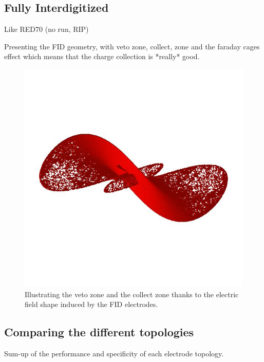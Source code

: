 \subsection{Fully Interdigitized}

Like RED70 (no run, RIP)

Presenting the FID geometry, with veto zone, collect, zone and the faraday cages effect which means that the charge collection is *really* good.

\begin{figure}
\centering
\includegraphics[width=\linewidth]{Figures/placeholder.jpg}
\caption{Illustrating the veto zone and the collect zone thanks to the electric field shape induced by the FID electrodes.}
\label{fig:fid-illustration}
\end{figure}

\subsection{Comparing the different topologies}

\begin{table}[]
\centering
\resizebox{\linewidth}{!}{
	
}
\caption{Sum-up of the performance and specificity of each electrode topology.}
\label{tab:stream-glitch-time-cut}
\end{table}

